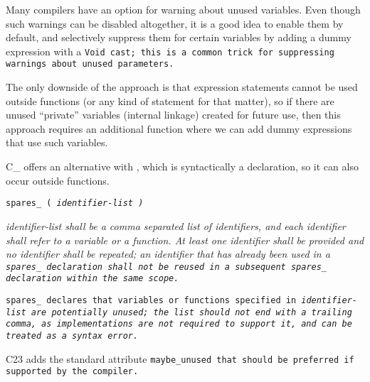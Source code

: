 Many compilers have an option for warning about unused variables.
Even though such warnings can be disabled altogether,
it is a good idea to enable them by default, and selectively suppress them
for certain variables by adding a dummy expression with a \tt{Void} cast;
this is a common trick for suppressing warnings about unused parameters.

The only downside of the approach is that expression statements cannot
be used outside functions (or any kind of statement for that matter),
so if there are unused ``private'' variables (internal linkage)
created for future use, then this approach requires an additional
function where we can add dummy expressions that use such variables.

C\_ offers an alternative with ,
which is syntactically a declaration, so it can also occur outside functions.


\tt{spares_ (} \it{identifier-list} \tt{)}

\pagebreak


\it{identifier-list} shall be a comma separated list of identifiers,
and each identifier shall refer to a variable or a function.
At least one identifier shall be provided and no identifier shall be repeated;
an identifier that has already been used in a \tt{spares_} declaration shall
not be reused in a subsequent \tt{spares_} declaration within the same scope.


\tt{spares_} declares that variables or functions
specified in \it{identifier-list} are potentially unused;
the list should not end with a trailing comma, as implementations are
not required to support it, and can be treated as a syntax error.

\note C23 adds the standard attribute \tt{maybe_unused}
that should be preferred if supported by the compiler.
